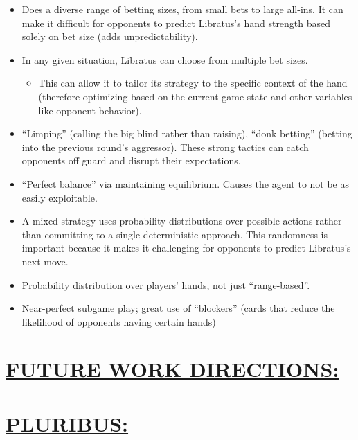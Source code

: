 \documentclass[
]{article}
\begin{document}
\begin{itemize}
\item
  Does a diverse range of betting sizes, from small bets to large
  all-ins. It can make it difficult for opponents to predict Libratus's
  hand strength based solely on bet size (adds unpredictability).
\item
  In any given situation, Libratus can choose from multiple bet sizes.

  \begin{itemize}
  \item
    This can allow it to tailor its strategy to the specific context of
    the hand (therefore optimizing based on the current game state and
    other variables like opponent behavior).
  \end{itemize}
\item
  ``Limping'' (calling the big blind rather than raising), ``donk
  betting'' (betting into the previous round's aggressor). These strong
  tactics can catch opponents off guard and disrupt their expectations.
\item
  ``Perfect balance'' via maintaining equilibrium. Causes the agent to
  not be as easily exploitable.
\item
  A mixed strategy uses probability distributions over possible actions
  rather than committing to a single deterministic approach. This
  randomness is important because it makes it challenging for opponents
  to predict Libratus's next move.
\item
  Probability distribution over players' hands, not just
  ``range-based''.
\item
  Near-perfect subgame play; great use of ``blockers'' (cards that
  reduce the likelihood of opponents having certain hands)
\end{itemize}

\section*{\texorpdfstring{\textbf{\ul{FUTURE WORK
DIRECTIONS:}}}{FUTURE WORK DIRECTIONS:}}\label{future-work-directions}

\section*{\texorpdfstring{\textbf{\ul{PLURIBUS:}}}{PLURIBUS:}}\label{pluribus}
\end{document}
